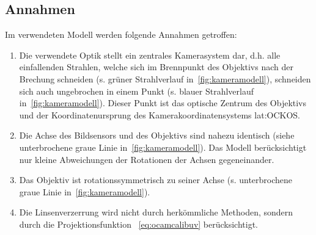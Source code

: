 \subsection{Annahmen}
Im verwendeten Modell werden folgende Annahmen getroffen:
\begin{enumerate}
\item Die verwendete Optik stellt ein zentrales Kamerasystem dar, d.h. alle einfallenden Strahlen, welche sich im Brennpunkt des Objektivs nach der Brechung schneiden (s. grüner Strahlverlauf in~\ref{fig:kameramodell}), schneiden sich auch ungebrochen in einem Punkt (s. blauer Strahlverlauf in~\ref{fig:kameramodell}). Dieser Punkt ist das optische Zentrum des Objektivs und der Koordinatenursprung des Kamerakoordinatensystems \gls{lat:OCKOS}.
\item \label{item:ocamcalibassm2} Die Achse des Bildsensors und des Objektivs sind nahezu identisch (siehe unterbrochene graue Linie in~\ref{fig:kameramodell}). Das Modell berücksichtigt nur kleine Abweichungen der Rotationen der Achsen gegeneinander.
\item Das Objektiv ist rotationssymmetrisch zu seiner Achse (s. unterbrochene graue Linie in~\ref{fig:kameramodell}).
\item Die Linsenverzerrung wird nicht durch herkömmliche Methoden, sondern durch die Projektionsfunktion ~\eqref{eq:ocamcalibuv} berücksichtigt.
\end{enumerate}

